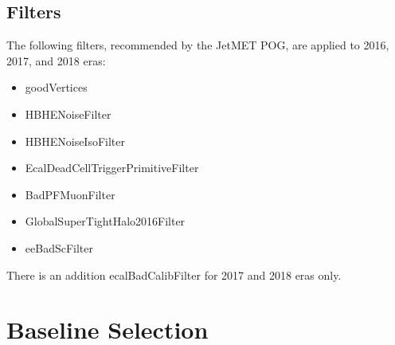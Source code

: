 \subsection{Filters}
The following filters, recommended by the JetMET POG, are applied to 2016, 2017, and 2018 eras:
\begin{itemize}
	\item goodVertices
	\item HBHENoiseFilter
	\item HBHENoiseIsoFilter
	\item EcalDeadCellTriggerPrimitiveFilter
	\item BadPFMuonFilter
	\item GlobalSuperTightHalo2016Filter
	\item eeBadScFilter
\end{itemize}
There is an addition ecalBadCalibFilter for 2017 and 2018 eras only.

\section{Baseline Selection} \label{sec:Baseline}

